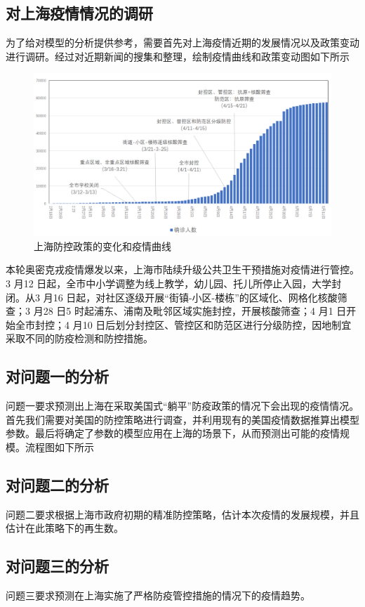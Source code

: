 \documentclass[bwprint]{gmcmthesis}
\numberwithin{figure}{section}
\begin{document}
\subsection{对上海疫情情况的调研}
为了给对模型的分析提供参考，需要首先对上海疫情近期的发展情况以及政策变动进行调研。经过对近期新闻的搜集和整理，绘制疫情曲线和政策变动图如下所示
\begin{figure}[!h]
\centering
\includegraphics[width=.9\textwidth]{shanghai_bianhua.png}
\caption{上海防控政策的变化和疫情曲线}
\label{fig3}
\end{figure}
\par 本轮奥密克戎疫情爆发以来，上海市陆续升级公共卫生干预措施对疫情进行管控。3 月12 日起，全市中小学调整为线上教学，幼儿园、托儿所停止入园，大学封闭。从3 月16 日起，对社区逐级开展“街镇-小区-楼栋”的区域化、网格化核酸筛查；3 月28 日5 时起浦东、浦南及毗邻区域实施封控，开展核酸筛查；4 月1 日开始全市封控；4 月10 日后划分封控区、管控区和防范区进行分级防控，因地制宜采取不同的防疫检测和防控措施。
\subsection{对问题一的分析}
问题一要求预测出上海在采取美国式“躺平”防疫政策的情况下会出现的疫情情况。首先我们需要对美国的防控策略进行调查，并利用现有的美国疫情数据推算出模型参数。最后将确定了参数的模型应用在上海的场景下，从而预测出可能的疫情规模。流程图如下所示
\subsection{对问题二的分析}
问题二要求根据上海市政府初期的精准防控策略，估计本次疫情的发展规模，并且估计在此策略下的再生数。
\subsection{对问题三的分析}
问题三要求预测在上海实施了严格防疫管控措施的情况下的疫情趋势。
\end{document}
